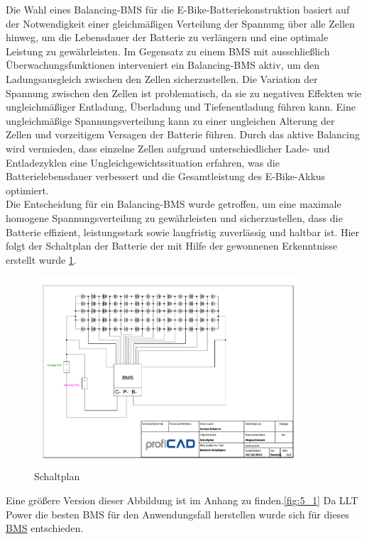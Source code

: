 
Die Wahl eines Balancing-BMS für die E-Bike-Batteriekonstruktion basiert auf der Notwendigkeit einer gleichmäßigen Verteilung der Spannung über alle Zellen hinweg, um die Lebensdauer der Batterie zu verlängern und eine optimale Leistung zu gewährleisten.
Im Gegensatz zu einem BMS mit ausschließlich Überwachungsfunktionen interveniert ein Balancing-BMS aktiv, um den Ladungsausgleich zwischen den Zellen sicherzustellen.
Die Variation der Spannung zwischen den Zellen ist problematisch, da sie zu negativen Effekten wie ungleichmäßiger Entladung, Überladung und Tiefenentladung führen kann.
Eine ungleichmäßige Spannungsverteilung kann zu einer ungleichen Alterung der Zellen und vorzeitigem Versagen der Batterie führen.
Durch das aktive Balancing wird vermieden, dass einzelne Zellen aufgrund unterschiedlicher Lade- und Entladezyklen eine Ungleichgewichtssituation erfahren, was die Batterielebensdauer verbessert und die Gesamtleistung des E-Bike-Akkus optimiert.\\

Die Entscheidung für ein Balancing-BMS wurde getroffen, um eine maximale homogene Spannungsverteilung zu gewährleisten und sicherzustellen, dass die Batterie effizient, leistungsstark sowie langfristig zuverlässig und haltbar ist.
Hier folgt der Schaltplan der Batterie der mit Hilfe der gewonnenen Erkenntnisse erstellt wurde \ref{fig:5}.

\begin{figure}[h]
    \centering
    \includegraphics[width=10cm]{images/Schaltplan.pdf}
    \caption{Schaltplan\cite{lorenz_scherrer_selbst_2023}}%
    \label{fig:5}
\end{figure}
Eine größere Version dieser Abbildung ist im Anhang zu finden.\ref{fig:5_1}
Da LLT Power die besten BMS für den Anwendungsfall herstellen wurde sich für dieses \href{https://www.lithiumbatterypcb.com/product/10s-11s-12s-13s-14s-15s-36v-48v-60v-bms-with-bluetooth-and-pc-communication-120a-constant-current/}{BMS} entschieden.

